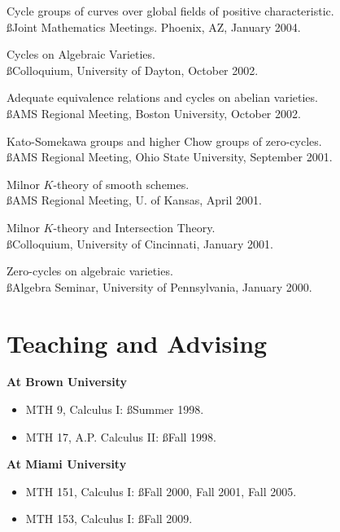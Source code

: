 \documentclass[overlapped,line,letterpaper]{res}
\begin{document}
\begin{resume}
Cycle groups of curves over global fields of positive characteristic.  \\ {\ss Joint Mathematics Meetings.  Phoenix, AZ, January 2004.}

\smallskip
Cycles on Algebraic Varieties.  \\ {\ss Colloquium, University of Dayton, October 2002.}

\smallskip
Adequate equivalence relations and cycles on abelian varieties.  \\
{\ss AMS Regional Meeting, Boston University, October 2002.}

\smallskip
Kato-Somekawa groups and higher Chow groups of zero-cycles. \\ {\ss AMS Regional Meeting, Ohio State University, September 2001.}

\smallskip
Milnor $K$-theory of smooth schemes.  \\ {\ss AMS Regional Meeting, U. of Kansas, April 2001.}

\smallskip
Milnor $K$-theory and Intersection Theory.  \\ {\ss Colloquium, University of 
Cincinnati, January 2001.}

\smallskip
Zero-cycles on algebraic varieties.  \\ {\ss Algebra Seminar, University of Pennsylvania, January 2000.}


\large
\section{\bf Teaching and Advising}
\vspace{3 mm}
\normalsize

{\bf At Brown University}

\begin{itemize}

\item
MTH 9, Calculus I: {\ss Summer 1998}.

\item
MTH 17, A.P. Calculus II: {\ss Fall 1998.}


\end{itemize}


{\bf At Miami University}

\begin{itemize}

\item
MTH 151, Calculus I: {\ss Fall 2000, Fall 2001, Fall 2005.}

\item
MTH 153, Calculus I: {\ss Fall 2009.}


\end{itemize}
\end{resume}
\end{document}
